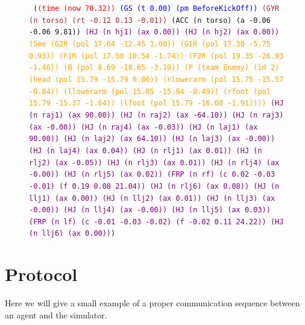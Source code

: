 \begin{figure}[t]
\begin{center}
\texttt{\small
(\textcolor{Red}{(time (now 70.32))} \textcolor{Blue}{(GS (t 0.00) (pm BeforeKickOff))} \textcolor{Brown}{(GYR (n torso) (rt -0.12 0.13 -0.01))} \textcolor{OliveGreen}{(ACC (n torso) (a -0.06 -0.06 9.81))} \textcolor{Purple}{(HJ (n hj1) (ax 0.00)) (HJ (n hj2) (ax 0.00))} \textcolor{Orange}{(See (G2R (pol 17.64 -12.45 1.00)) (G1R (pol 17.30 -5.75 0.93)) (F1R (pol 17.50 10.54 -1.74)) (F2R (pol 19.35 -26.93 -1.46)) (B (pol 8.69 -18.65 -3.10)) (P (team Enemy) (id 2) (head (pol 15.79 -15.79 0.06)) (rlowerarm (pol 15.75 -15.57 -0.84)) (llowerarm (pol 15.85 -15.84 -0.49)) (rfoot (pol 15.79 -15.37 -1.64)) (lfoot (pol 15.79 -16.08 -1.91))))} \textcolor{Purple}{(HJ (n raj1) (ax 90.00)) (HJ (n raj2) (ax -64.10)) (HJ (n raj3) (ax -0.00)) (HJ (n raj4) (ax -0.03)) (HJ (n laj1) (ax 90.00)) (HJ (n laj2) (ax 64.10)) (HJ (n laj3) (ax -0.00)) (HJ (n laj4) (ax 0.04)) (HJ (n rlj1) (ax 0.01)) (HJ (n rlj2) (ax -0.05)) (HJ (n rlj3) (ax 0.01)) (HJ (n rlj4) (ax -0.00)) (HJ (n rlj5) (ax 0.02)) (FRP (n rf) (c 0.02 -0.03 -0.01) (f 0.19 0.08 21.04)) (HJ (n rlj6) (ax 0.08)) (HJ (n llj1) (ax 0.00)) (HJ (n llj2) (ax 0.01)) (HJ (n llj3) (ax -0.00)) (HJ (n llj4) (ax -0.00)) (HJ (n llj5) (ax 0.03)) (FRP (n lf) (c -0.01 -0.03 -0.02) (f -0.02 0.11 24.22)) (HJ (n llj6) (ax 0.00))})
}
	\label{fig:sensemsg}
\end{center}
\end{figure}

\section{Protocol}

Here we will give a small example of a proper communication sequence
between an agent and the simulator.

